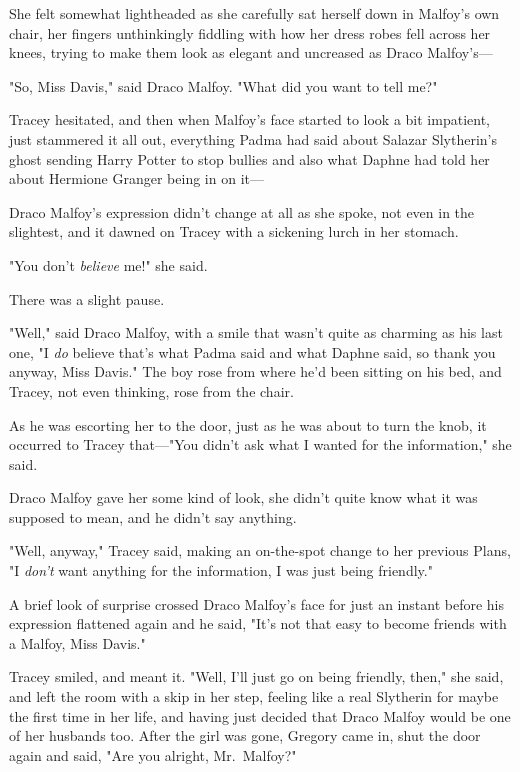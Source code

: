 She felt somewhat lightheaded as she carefully sat herself down in Malfoy's own
chair, her fingers unthinkingly fiddling with how her dress robes fell across
her knees, trying to make them look as elegant and uncreased as Draco
Malfoy's—

"So, Miss Davis," said Draco Malfoy. "What did you want to tell me?"

Tracey hesitated, and then when Malfoy's face started to look a bit impatient,
just stammered it all out, everything Padma had said about Salazar Slytherin's
ghost sending Harry Potter to stop bullies and also what Daphne had told her
about Hermione Granger being in on it—

Draco Malfoy's expression didn't change at all as she spoke, not even in the
slightest, and it dawned on Tracey with a sickening lurch in her stomach.

"You don't \emph{believe} me!" she said.

There was a slight pause.

"Well," said Draco Malfoy, with a smile that wasn't quite as charming as his
last one, "I \emph{do} believe that's what Padma said and what Daphne said, so
thank you anyway, Miss Davis." The boy rose from where he'd been sitting on his
bed, and Tracey, not even thinking, rose from the chair.

As he was escorting her to the door, just as he was about to turn the knob, it
occurred to Tracey that—"You didn't ask what I wanted for the information,"
she said.

Draco Malfoy gave her some kind of look, she didn't quite know what it was
supposed to mean, and he didn't say anything.

"Well, anyway," Tracey said, making an on-the-spot change to her previous
Plans, "I \emph{don't} want anything for the information, I was just being
friendly."

A brief look of surprise crossed Draco Malfoy's face for just an instant before
his expression flattened again and he said, "It's not that easy to become
friends with a Malfoy, Miss Davis."

Tracey smiled, and meant it. "Well, I'll just go on being friendly, then," she
said, and left the room with a skip in her step, feeling like a real Slytherin
for maybe the first time in her life, and having just decided that Draco Malfoy
would be one of her husbands too.
\sbreak
After the girl was gone, Gregory came in, shut the door again and said, "Are
you alright, Mr.~Malfoy?"

